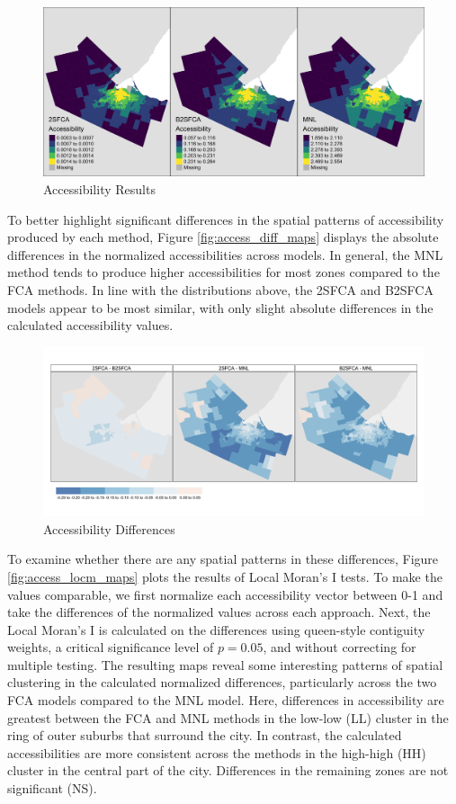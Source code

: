 \documentclass{article}
\begin{document}
\begin{figure}
\includegraphics[width=1\linewidth]{./img/access_maps} \caption{\label{fig:access_maps}Accessibility Results}\label{fig:plot access_maps}
\end{figure}

To better highlight significant differences in the spatial patterns of
accessibility produced by each method, Figure \ref{fig:access_diff_maps}
displays the absolute differences in the normalized accessibilities
across models. In general, the MNL method tends to produce higher
accessibilities for most zones compared to the FCA methods. In line with
the distributions above, the 2SFCA and B2SFCA models appear to be most
similar, with only slight absolute differences in the calculated
accessibility values.

\begin{figure}
\includegraphics[width=1\linewidth]{./img/access_diff_maps} \caption{\label{fig:access_diff_maps}Accessibility Differences}\label{fig:plot access_diff_maps}
\end{figure}

To examine whether there are any spatial patterns in these differences,
Figure \ref{fig:access_locm_maps} plots the results of Local Moran's I
tests. To make the values comparable, we first normalize each
accessibility vector between 0-1 and take the differences of the
normalized values across each approach. Next, the Local Moran's I is
calculated on the differences using queen-style contiguity weights, a
critical significance level of \(p=0.05\), and without correcting for
multiple testing. The resulting maps reveal some interesting patterns of
spatial clustering in the calculated normalized differences,
particularly across the two FCA models compared to the MNL model. Here,
differences in accessibility are greatest between the FCA and MNL
methods in the low-low (LL) cluster in the ring of outer suburbs that
surround the city. In contrast, the calculated accessibilities are more
consistent across the methods in the high-high (HH) cluster in the
central part of the city. Differences in the remaining zones are not
significant (NS).
\end{document}
